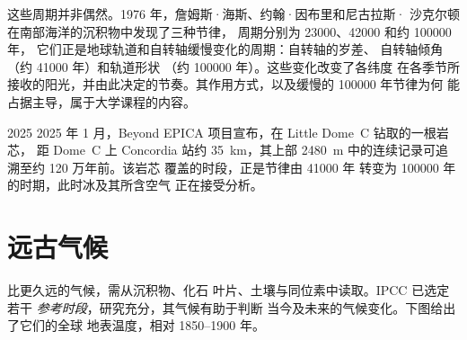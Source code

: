这些周期并非偶然。1976 年，詹姆斯·海斯、约翰·因布里和尼古拉斯·
沙克尔顿在南部海洋的沉积物中发现了三种节律，
周期分别为 \num{23000}、\num{42000} 和约 \num{100000} 年，
它们正是地球轨道和自转轴缓慢变化的周期：自转轴的岁差、
自转轴倾角（约 \num{41000} 年）和轨道形状
（约 \num{100000} 年）。这些变化改变了各纬度
在各季节所接收的阳光，并由此决定的节奏。其作用方式，以及缓慢的 \num{100000} 年节律为何
能占据主导，属于大学课程的内容。

\begin{dated}{2025}
2025 年 1 月，Beyond EPICA 项目宣布，在 Little Dome~C 钻取的一根岩芯，
距 Dome~C 上 Concordia 站约 \qty{35}{km}，其上部
\qty{2480}{m} 中的连续记录可追溯至约 120 万年前。该岩芯
覆盖的时段，正是节律由 \num{41000} 年
转变为 \num{100000} 年的时期，此时冰及其所含空气
正在接受分析。
\end{dated}

\section{远古气候}

比更久远的气候，需从沉积物、化石
叶片、土壤与同位素中读取。IPCC 已选定若干
\emph{参考时段}，研究充分，其气候有助于判断
当今及未来的气候变化。下图给出了它们的全球
地表温度，相对 1850--1900 年。

